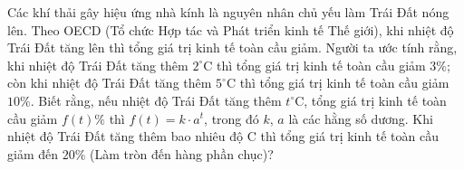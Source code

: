 \begin{ex}%
Các khí thải gây hiệu ứng nhà kính là nguyên nhân chủ yếu làm Trái Đất nóng lên. Theo OECD (Tổ chức Hợp tác và Phát triển kinh tế Thế giới), khi nhiệt độ Trái Đất tăng lên thì tổng giá trị kinh tế toàn cầu giảm. Người ta ước tính rằng, khi nhiệt độ Trái Đất tăng thêm $2^\circ$C thì tổng giá trị kinh tế toàn cầu giảm $3\%$; còn khi nhiệt độ Trái Đất tăng thêm $5^{\circ}$C thì tổng giá trị kinh tế toàn cầu giảm $10\%$. Biết rằng, nếu nhiệt độ Trái Đất tăng thêm $t^\circ$C, tổng giá trị kinh tế toàn cầu giảm $f(t)\%$ thì $f(t)=k\cdot a^t$, trong đó $k$, $a$ là các hằng số dương. Khi nhiệt độ Trái Đất tăng thêm bao nhiêu độ C thì tổng giá trị kinh tế toàn cầu giảm đến $20\%$ (Làm tròn đến hàng phần chục)?
\end{ex}

